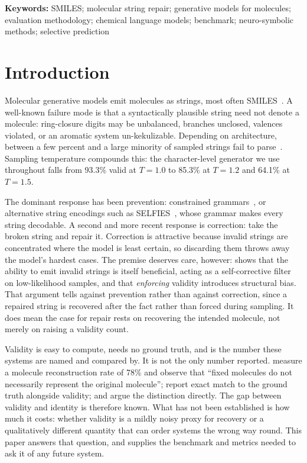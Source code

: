 \documentclass[journal=jcisd8,manuscript=article]{achemso}
\begin{document}
\vspace{0.5em}
\noindent\textbf{Keywords:} SMILES; molecular string repair; generative models
for molecules; evaluation methodology; chemical language models; benchmark;
neuro-symbolic methods; selective prediction

\section{Introduction}

Molecular generative models emit molecules as strings, most often
SMILES~\citep{weininger1988smiles}. A well-known failure mode is that a
syntactically plausible string need not denote a molecule: ring-closure digits
may be unbalanced, branches unclosed, valences violated, or an aromatic system
un-kekulizable. Depending on architecture, between a few percent and a large
minority of sampled strings fail to
parse~\citep{brown2019guacamol,polykovskiy2020moses}. Sampling temperature
compounds this: the character-level generator we use throughout falls from
93.3\% valid at $T{=}1.0$ to 85.3\% at $T{=}1.2$ and 64.1\% at $T{=}1.5$.

The dominant response has been prevention: constrained
grammars~\citep{kusner2017grammar,dai2018syntax}, or alternative string
encodings such as SELFIES~\citep{krenn2020selfies}, whose grammar makes every
string decodable. A second and more recent response is correction: take the
broken string and repair it. Correction is attractive because invalid strings are
concentrated where the model is least certain, so discarding them throws away the
model's hardest cases. The premise deserves care, however:
\citet{skinnider2024invalid} shows that the ability to emit invalid strings is
itself beneficial, acting as a self-corrective filter on low-likelihood samples,
and that \emph{enforcing} validity introduces structural bias. That argument
tells against prevention rather than against correction, since a repaired string
is recovered after the fact rather than forced during sampling. It does mean the
case for repair rests on recovering the intended molecule, not merely on raising
a validity count.

Validity is easy to compute, needs no ground truth, and is the number these
systems are named and compared by. It is not the only number reported.
\citet{schoenmaker2023uncorrupt} measure a molecule reconstruction rate of 78\%
and observe that ``fixed molecules do not necessarily represent the original
molecule''; \citet{smiself2025} report exact match to the ground truth alongside
validity; and \citet{amrec} argue the distinction directly. The gap between
validity and identity is therefore known. What has not been established is how
much it costs: whether validity is a mildly noisy proxy for recovery or a
qualitatively different quantity that can order systems the wrong way round.
This paper answers that question, and supplies the benchmark and metrics needed
to ask it of any future system.
\end{document}
